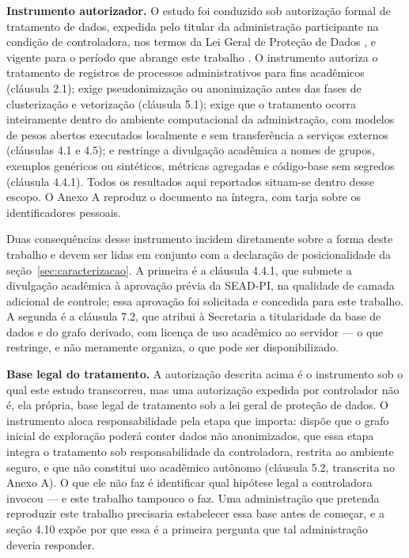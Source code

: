 \textbf{Instrumento autorizador.} O estudo foi conduzido sob autorização formal de tratamento de
dados, expedida pelo titular da administração participante na condição de controladora, nos termos
da Lei Geral de Proteção de Dados \cite{brasil2018lgpd}, e vigente para o período que abrange este
trabalho \cite{seadpi2026termo}. O instrumento autoriza o tratamento de registros de processos
administrativos para fins acadêmicos (cláusula 2.1); exige pseudonimização ou anonimização antes
das fases de clusterização e vetorização (cláusula 5.1); exige que o tratamento ocorra inteiramente
dentro do ambiente computacional da administração, com modelos de pesos abertos executados
localmente e sem transferência a serviços externos (cláusulas 4.1 e 4.5); e restringe a divulgação
acadêmica a nomes de grupos, exemplos genéricos ou sintéticos, métricas agregadas e código-base sem
segredos (cláusula 4.4.1). Todos os resultados aqui reportados situam-se dentro desse escopo. O
Anexo A reproduz o documento na íntegra, com tarja sobre os identificadores pessoais.

Duas consequências desse instrumento incidem diretamente sobre a forma deste trabalho e devem ser
lidas em conjunto com a declaração de posicionalidade da seção~\ref{sec:caracterizacao}. A primeira é a cláusula 4.4.1,
que submete a divulgação acadêmica à aprovação prévia da SEAD-PI, na qualidade de camada adicional
de controle; essa aprovação foi solicitada e concedida para este trabalho. A segunda é a cláusula
7.2, que atribui à Secretaria a titularidade da base de dados e do grafo derivado, com licença de
uso acadêmico ao servidor --- o que restringe, e não meramente organiza, o que pode ser
disponibilizado.

\textbf{Base legal do tratamento.} A autorização descrita acima é o instrumento sob o qual este
estudo transcorreu, mas uma autorização expedida por controlador não é, ela própria, base legal de
tratamento sob a lei geral de proteção de dados. O instrumento aloca responsabilidade pela etapa
que importa: dispõe que o grafo inicial de exploração poderá conter dados não anonimizados, que
essa etapa integra o tratamento sob responsabilidade da controladora, restrita ao ambiente seguro,
e que não constitui uso acadêmico autônomo (cláusula 5.2, transcrita no Anexo A). O que ele não faz
é identificar qual hipótese legal a controladora invocou --- e este trabalho tampouco o faz. Uma administração que pretenda reproduzir este trabalho
precisaria estabelecer essa base antes de começar, e a seção 4.10 expõe por que essa é a primeira
pergunta que tal administração deveria responder.

